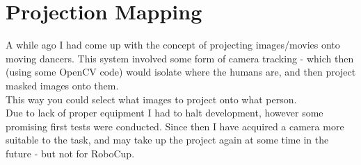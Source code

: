 		\section{Projection Mapping}
			A while ago I had come up with the concept of projecting images/movies onto moving dancers. This system involved some form of camera tracking - which then (using some OpenCV code) would isolate where the humans are, and then project masked images onto them.\\
			
			This way you could select what images to project onto what person.\\
			
			Due to lack of proper equipment I had to halt development, however some promising first tests were conducted. Since then I have acquired a camera more suitable to the task, and may take up the project again at some time in the future - but not for RoboCup.\\